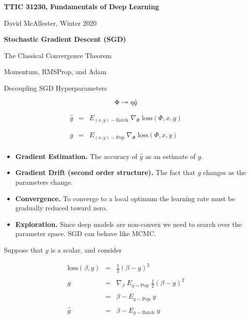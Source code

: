 


\newcommand{\solution}[1]{\bigskip {\bf Solution}: #1}



{\Huge
  \centerline{\bf TTIC 31230, Fundamentals of Deep Learning}
  \bigskip
  \centerline{David McAllester, Winter 2020}
  \vfill
  \centerline{\bf Stochastic Gradient Descent (SGD)}
  \vfill
  \centerline{The Classical Convergence Theorem}
  \vfill
  \centerline{Momentum, RMSProp, and Adam}
  \vfill
  \centerline{Decoupling SGD Hyperparameters}


$$\Phi \;\mbox{\tt -=}\; \eta \hat{g}$$

\vfill
\begin{eqnarray*}
  \hat{g} & = & E_{(x,y) \sim \mathrm{Batch}}\;\nabla_\Phi\;\mathrm{loss}(\Phi,x,y) \\
  \\
  \\
  g & = & E_{(x,y) \sim \mathrm{Pop}}\;\nabla_\Phi\;\mathrm{loss}(\Phi,x,y) \\
\end{eqnarray*}


\vfill
\begin{itemize}
\item {\bf Gradient Estimation.} The accuracy of $\hat{g}$ as an estimate of $g$.

  \vfill
\item {\bf Gradient Drift (second order structure).} The fact that $g$ changes as the parameters change.

  \vfill
\item {\bf Convergence.} To converge to a local optimum the learning rate must be gradually reduced toward zero.

  \vfill
  \item {\bf Exploration.} Since deep models are non-convex we need to search over the parameter space.  SGD can behave like MCMC.
\end{itemize}


Suppose that $y$ is a scalar, and consider

\begin{eqnarray*}
 \mathrm{loss}(\beta,y) & = & \frac{1}{2}(\beta - y)^2 \\
 \\
  g & = &  \nabla_\beta\;E_{y \sim \mathrm{Pop}}\;\frac{1}{2}(\beta - y)^2 \\
  \\
  & = & \beta - E_{y \sim \mathrm{Pop}} \; y \\
  \\
  \hat{g} & = &\beta - E_{y \sim \mathrm{Batch}} \;y
\end{eqnarray*}

}
